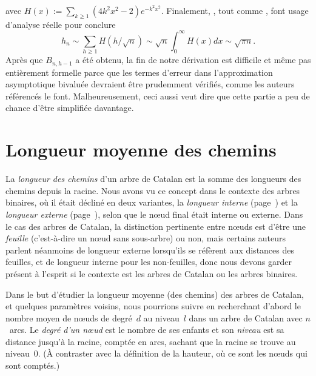 avec \(H(x) := \sum_{k \geqslant
  1}(4k^2x^2-2)e^{-k^2x^2}\). Finalement,
\citet*[5.9]{SedgewickFlajolet_1996}, tout comme
\citet*[9.6]{GrahamKnuthPatashnik_1994}, font usage d'analyse réelle
pour conclure
\begin{equation*}
h_{n} \sim \sum_{h \geqslant 1}H(h/\!\sqrt{n})
\sim \sqrt{n} \int_0^{\infty}\!\!H(x) dx \sim \sqrt{\pi n}.
\end{equation*}
Après que \(B_{n,h-1}\) a été obtenu, la fin de notre dérivation est
difficile et même pas entièrement formelle parce que les termes
d'erreur dans l'approximation asymptotique bivaluée devraient être
prudemment vérifiés, comme les auteurs référencés le
font. Malheureusement, ceci aussi veut dire que cette partie a peu de
chance d'être simplifiée davantage.

\section{Longueur moyenne des chemins}

La \emph{longueur des chemins} d'un arbre de Catalan est la somme des
longueurs des chemins depuis la racine. Nous avons vu ce concept dans
le contexte des arbres binaires, où il était décliné en deux
variantes, la \emph{longueur interne}
(page~\pageref{insertion__internal_path_length}) et la \emph{longueur
  externe} (page~\pageref{sorting__external_path_length}), selon que
le n{\oe}ud final était interne ou externe. Dans le cas des arbres de
Catalan, la distinction pertinente entre n{\oe}uds est d'être une
\emph{feuille} (c'est-à-dire un n{\oe}ud sans sous-arbre) ou non, mais
certains auteurs parlent néanmoins de longueur externe lorsqu'ils se
réfèrent aux distances des feuilles, et de longueur interne pour les
non-feuilles, donc nous devons garder présent à l'esprit si le
contexte est les arbres de Catalan ou les arbres binaires.

Dans le but d'étudier la longueur moyenne (des chemins) des arbres de
Catalan, et quelques paramètres voisins, nous pourrions suivre
\cite{DershowitzZaks_1981} en recherchant d'abord le nombre moyen de
n{\oe}uds de degré~\(d\) au niveau~\(l\) dans un arbre de Catalan
avec \(n\)~arcs. Le \emph{degré d'un n{\oe}ud} est le nombre de ses
enfants et son \emph{niveau} est sa distance jusqu'à la racine,
comptée en arcs, sachant que la racine se trouve au niveau~\(0\). (À
contraster avec la définition de la hauteur, où ce sont les n{\oe}uds
qui sont comptés.)

